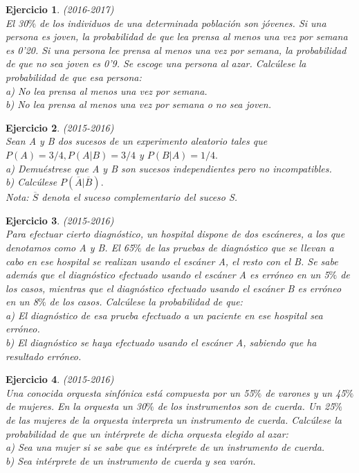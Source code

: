 \documentclass[12pt, a4paper]{amsart}
\newtheorem{ejer}{Ejercicio}
\begin{document}
\begin{ejer}\em (2016-2017)\\
El 30$\%$ de los individuos de una determinada población son jóvenes. Si una persona es joven, la probabilidad
de que lea prensa al menos una vez por semana es 0'20. Si una persona lee prensa al menos una vez por
semana, la probabilidad de que no sea joven es 0'9. Se escoge una persona al azar. Calcúlese la probabilidad
de que esa persona:\\
a) No lea prensa al menos una vez por semana.\\
b) No lea prensa al menos una vez por semana o no sea joven.
\end{ejer}

\begin{ejer}\em (2015-2016)\\
Sean A y B dos sucesos de un experimento aleatorio tales que $P(A) = 3 / 4, P(A | B) = 3 / 4$ y $P(B | A) = 1 / 4.$\\
a) Demuéstrese que A y B son sucesos independientes pero no incompatibles.\\
b) Calcúlese $P(\overline{A} | \overline{B}).$\\
Nota: $\overline{S}$ denota el suceso complementario del suceso S.
\end{ejer}

\begin{ejer}\em (2015-2016)\\
Para efectuar cierto diagnóstico, un hospital dispone de dos escáneres, a los que denotamos como A y B. El
65$\%$ de las pruebas de diagnóstico que se llevan a cabo en ese hospital se realizan usando el escáner A, el
resto con el B. Se sabe además que el diagnóstico efectuado usando el escáner A es erróneo en un 5$\%$ de los
casos, mientras que el diagnóstico efectuado usando el escáner B es erróneo en un 8$\%$ de los casos. Calcúlese
la probabilidad de que:\\
a) El diagnóstico de esa prueba efectuado a un paciente en ese hospital sea erróneo.\\
b) El diagnóstico se haya efectuado usando el escáner A, sabiendo que ha resultado erróneo.
\end{ejer}

\begin{ejer}\em (2015-2016)\\
Una conocida orquesta sinfónica está compuesta por un 55$\%$ de varones y un 45$\%$ de mujeres. En la orquesta
un 30$\%$ de los instrumentos son de cuerda. Un 25$\%$ de las mujeres de la orquesta interpreta un instrumento de
cuerda. Calcúlese la probabilidad de que un intérprete de dicha orquesta elegido al azar:\\
a) Sea una mujer si se sabe que es intérprete de un instrumento de cuerda.\\
b) Sea intérprete de un instrumento de cuerda y sea varón.
\end{ejer}
\end{document}
